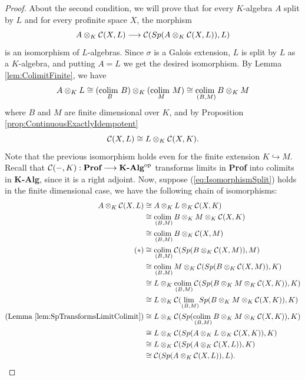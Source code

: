 \begin{proposition}
\begin{proof}
        About the second condition, we will prove that for every $K$-algebra $A$ split by $L$ and for every profinite space $X$, the morphism
        \begin{equation}
        \label{eq:IsomorphismSplit}
            A\otimes_{K}\mathcal{C}(X,L)\longrightarrow\mathcal{C}(Sp(A\otimes_{K}\mathcal{C}(X,L)), L)
        \end{equation}
        is an isomorphism of $L$-algebras. Since $\sigma$ is a Galois extension, $L$ is split by $L$ as a $K$-algebra, and putting $A=L$ we get the desired isomorphism. By Lemma \ref{lem:ColimitFinite}, we have
        \[ A\otimes_{K}L\cong (\underset{B}{\text{colim }}B)\otimes_{K}(\underset{M}{\text{colim }}M)\cong\underset{(B,M)}{\text{colim }}B\otimes_{K}M \]
        where $B$ and $M$ are finite dimensional over $K$, and by Proposition \ref{prop:ContinuousExactlyIdempotent}
        \[ \mathcal{C}(X,L)\cong L\otimes_{K}\mathcal{C}(X,K). \]
        Note that the previous isomorphism holds even for the finite extension $K\hookrightarrow M$. Recall that $\mathcal{C}(-,K):\textbf{Prof}\longrightarrow{\textbf{K-Alg}}^{\mathrm{op}}$ transforms limits in \textbf{Prof} into colimits in \textbf{K-Alg}, since it is a right adjoint.
        Now, suppose (\ref{eq:IsomorphismSplit}) holds in the finite dimensional case, we have the following chain of isomorphisms:
        \begin{align*}
            A\otimes_{K}\mathcal{C}(X,L) & \cong A\otimes_{K}L\otimes_{K}\mathcal{C}(X,K)\\
            & \cong \underset{(B,M)}{\text{colim }}B\otimes_{K}M\otimes_{K}\mathcal{C}(X,K)\\
            & \cong \underset{(B,M)}{\text{colim }}B\otimes_{K}\mathcal{C}(X,M)\\
            (*)& \cong \underset{(B,M)}{\text{colim }}\mathcal{C}(Sp(B\otimes_{K}\mathcal{C}(X,M)),M)\\
            & \cong \underset{(B,M)}{\text{colim }}M\otimes_{K} \mathcal{C}(Sp(B\otimes_{K}\mathcal{C}(X,M)),K)\\
            & \cong L\otimes_{K}\underset{(B,M)}{\text{colim }}\mathcal{C}(Sp(B\otimes_{K}M\otimes_{K}\mathcal{C}(X,K)),K)\\
            & \cong L\otimes_{K}\mathcal{C}(\underset{(B,M)}{\text{lim }}Sp(B\otimes_{K}M\otimes_{K}\mathcal{C}(X,K)),K)\\
            (\text{Lemma \ref{lem:SpTransformsLimitColimit}})& \cong L\otimes_{K}\mathcal{C}(Sp(\underset{(B,M)}{\text{colim }}B\otimes_{K}M\otimes_{K}\mathcal{C}(X,K)),K)\\
            & \cong L\otimes_{K}\mathcal{C}(Sp(A\otimes_{K}L\otimes_{K}\mathcal{C}(X,K)),K)\\
            & \cong L\otimes_{K}\mathcal{C}(Sp(A\otimes_{K}\mathcal{C}(X,L)),K)\\
            & \cong \mathcal{C}(Sp(A\otimes_{K}\mathcal{C}(X,L)),L).
        \end{align*}


\end{proof}
\end{proposition}
